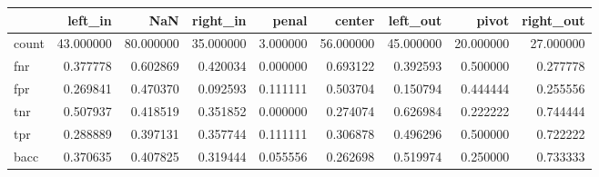 \begin{tabular}{lrrrrrrrr}
\toprule
{} &    left\_in &        NaN &   right\_in &     penal &     center &   left\_out &      pivot &  right\_out \\
\midrule
count &  43.000000 &  80.000000 &  35.000000 &  3.000000 &  56.000000 &  45.000000 &  20.000000 &  27.000000 \\
fnr   &   0.377778 &   0.602869 &   0.420034 &  0.000000 &   0.693122 &   0.392593 &   0.500000 &   0.277778 \\
fpr   &   0.269841 &   0.470370 &   0.092593 &  0.111111 &   0.503704 &   0.150794 &   0.444444 &   0.255556 \\
tnr   &   0.507937 &   0.418519 &   0.351852 &  0.000000 &   0.274074 &   0.626984 &   0.222222 &   0.744444 \\
tpr   &   0.288889 &   0.397131 &   0.357744 &  0.111111 &   0.306878 &   0.496296 &   0.500000 &   0.722222 \\
bacc  &   0.370635 &   0.407825 &   0.319444 &  0.055556 &   0.262698 &   0.519974 &   0.250000 &   0.733333 \\
\bottomrule
\end{tabular}

